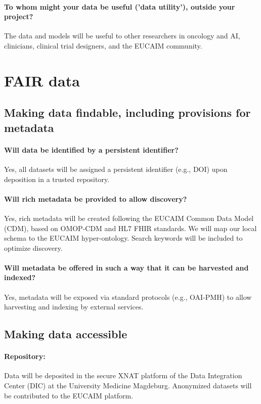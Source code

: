 \documentclass[11pt, a4paper]{article}
\begin{document}
\paragraph{To whom might your data be useful ('data utility'), outside your project?}
The data and models will be useful to other researchers in oncology and AI, clinicians, clinical trial designers, and the EUCAIM community.

\section*{FAIR data}

\subsection*{Making data findable, including provisions for metadata}

\paragraph{Will data be identified by a persistent identifier?}
Yes, all datasets will be assigned a persistent identifier (e.g., DOI) upon deposition in a trusted repository.

\paragraph{Will rich metadata be provided to allow discovery?}
Yes, rich metadata will be created following the EUCAIM Common Data Model (CDM), based on OMOP-CDM and HL7 FHIR standards. We will map our local schema to the EUCAIM hyper-ontology. Search keywords will be included to optimize discovery.

\paragraph{Will metadata be offered in such a way that it can be harvested and indexed?}
Yes, metadata will be exposed via standard protocols (e.g., OAI-PMH) to allow harvesting and indexing by external services.

\subsection*{Making data accessible}

\paragraph{Repository:}
Data will be deposited in the secure XNAT platform of the Data Integration Center (DIC) at the University Medicine Magdeburg. Anonymized datasets will be contributed to the EUCAIM platform.
\end{document}
